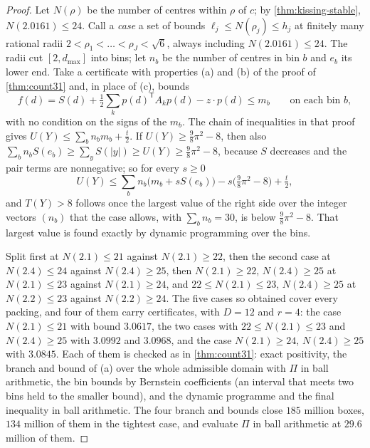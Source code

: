 \documentclass[11pt,reqno]{amsart}
\renewcommand{\_}{\origunderscore\allowbreak}
\numberwithin{equation}{section}
\theoremstyle{plain}
\theoremstyle{definition}
\theoremstyle{remark}
\begin{document}
\begin{proof}
Let $N(\rho)$ be the number of centres within $\rho$ of $c$; by
\cref{thm:kissing-stable}, $N(2.0161)\le24$. Call a \emph{case} a set of
bounds $\ell_j\le N(\rho_j)\le h_j$ at finitely many rational radii
$2<\rho_1<\dots<\rho_J<\sqrt6$, always including $N(2.0161)\le24$. The radii cut
$[2,d_{\max}]$ into bins; let $n_b$ be the number of centres in bin $b$ and
$e_b$ its lower end. Take a certificate with properties (a) and (b) of the
proof of \cref{thm:count31} and, in place of (c), bounds
\[
  f(d)=S(d)+\tfrac12\textstyle\sum_kp(d)^{\mathsf T}A_kp(d)-z\cdot p(d)\le m_b
  \qquad\text{on each bin } b ,
\]
with no condition on the signs of the $m_b$. The chain of inequalities in that
proof gives $U(Y)\le\sum_bn_bm_b+\frac t2$. If $U(Y)\ge\frac98\pi^2-8$, then
also $\sum_bn_bS(e_b)\ge\sum_yS(|y|)\ge U(Y)\ge\frac98\pi^2-8$, because $S$
decreases and the pair terms are nonnegative; so for every $s\ge0$
\[
  U(Y)\le\sum_bn_b\bigl(m_b+sS(e_b)\bigr)-s\bigl(\tfrac98\pi^2-8\bigr)+\tfrac t2 ,
\]
and $T(Y)>8$ follows once the largest value of the right side over the
integer vectors $(n_b)$ that the case allows, with $\sum_bn_b=30$, is below
$\frac98\pi^2-8$. That largest value is found exactly by dynamic programming
over the bins.

Split first at $N(2.1)\le21$ against $N(2.1)\ge22$, then the second case
at $N(2.4)\le24$ against $N(2.4)\ge25$, then $N(2.1)\ge22$, $N(2.4)\ge25$ at
$N(2.1)\le23$ against $N(2.1)\ge24$, and $22\le N(2.1)\le23$, $N(2.4)\ge25$
at $N(2.2)\le23$ against $N(2.2)\ge24$. The five cases so obtained cover every
packing, and four of them carry certificates, with $D=12$ and $r=4$: the
case $N(2.1)\le21$ with bound $3.0617$, the two cases with $22\le N(2.1)\le23$
and $N(2.4)\ge25$ with $3.0992$ and $3.0968$, and the case $N(2.1)\ge24$,
$N(2.4)\ge25$ with $3.0845$. Each of them is checked as in
\cref{thm:count31}: exact positivity, the branch and bound of (a) over the
whole admissible domain with $\Pi$ in ball arithmetic, the bin bounds by
Bernstein coefficients (an interval that meets two bins held to the smaller
bound), and the dynamic programme and the final inequality in ball
arithmetic. The four branch and bounds close $185$ million boxes, $134$
million of them in the tightest case, and evaluate $\Pi$ in ball arithmetic
at $29.6$ million of them.


\end{proof}
\end{document}
